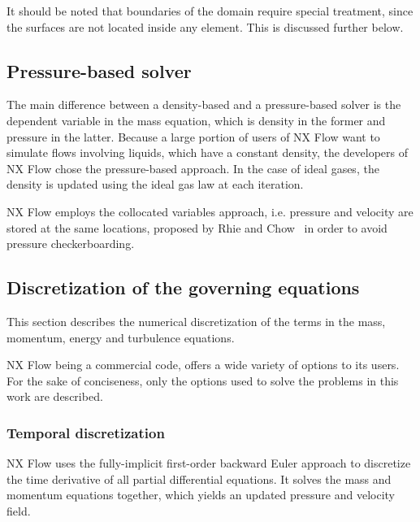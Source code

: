 It should be noted that boundaries of the domain require special treatment, since the surfaces are not located inside any element. This is discussed further below.

\subsection{Pressure-based solver}
\label{sec:pbased}
The main difference between a density-based and a pressure-based solver is the dependent variable in the mass equation, which is density in the former and pressure in the latter. Because a large portion of users of NX Flow want to simulate flows involving liquids, which have a constant density, the developers of NX Flow chose the pressure-based approach. In the case of ideal gases, the density is updated using the ideal gas law at each iteration.

NX Flow employs the collocated variables approach, i.e. pressure and velocity are stored at the same locations, proposed by Rhie and Chow~\cite{rhie1983numerical} in order to avoid pressure checkerboarding.

\subsection{Discretization of the governing equations}
\label{sec:nxnum}
This section describes the numerical discretization of the terms in the mass, momentum, energy and turbulence equations.

NX Flow being a commercial code, offers a wide variety of options to its users. For the sake of conciseness, only the options used to solve the problems in this work are described.

\subsubsection{Temporal discretization}
NX Flow uses the fully-implicit first-order backward Euler approach to discretize the time derivative of all partial differential equations. It solves the mass and momentum equations together, which yields an updated pressure and velocity field.


